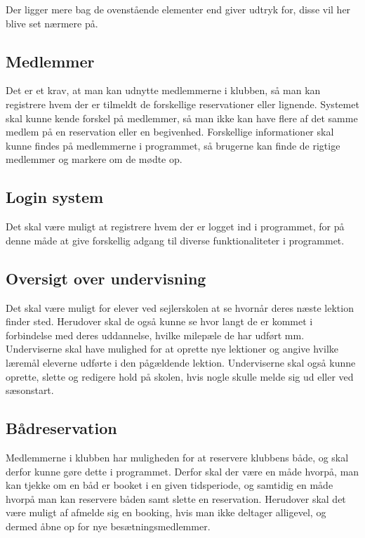 Der ligger mere bag de ovenstående elementer end  giver udtryk for, disse vil her blive set nærmere på.

\subsection{Medlemmer} 

Det er et krav, at man kan udnytte medlemmerne i klubben, så man kan registrere hvem der er tilmeldt de forskellige reservationer eller lignende. 
Systemet skal kunne kende forskel på medlemmer, så man ikke kan have flere af det samme medlem på en reservation eller en begivenhed.
Forskellige informationer skal kunne findes på medlemmerne i programmet, så brugerne kan finde de rigtige medlemmer og markere om de mødte op.

\subsection{Login system} 
Det skal være muligt at registrere hvem der er logget ind i programmet, for på denne måde at give forskellig adgang til diverse funktionaliteter i programmet.

\subsection{Oversigt over undervisning}

Det skal være muligt for elever ved sejlerskolen at se hvornår deres næste lektion finder sted.
Herudover skal de også kunne se hvor langt de er kommet i forbindelse med deres uddannelse, hvilke milepæle de har udført mm.
Underviserne skal have mulighed for at oprette nye lektioner og angive hvilke læremål eleverne udførte i den pågældende lektion. 
Underviserne skal også kunne oprette, slette og redigere hold på skolen, hvis nogle skulle melde sig ud eller ved sæsonstart.

\subsection{Bådreservation}

Medlemmerne i klubben har muligheden for at reservere klubbens både, og skal derfor kunne gøre dette i programmet.
Derfor skal der være en måde hvorpå, man kan tjekke om en båd er booket i en given tidsperiode, og samtidig en måde hvorpå man kan reservere båden samt slette en reservation.
Herudover skal det være muligt af afmelde sig en booking, hvis man ikke deltager alligevel, og dermed åbne op for nye besætningsmedlemmer.


